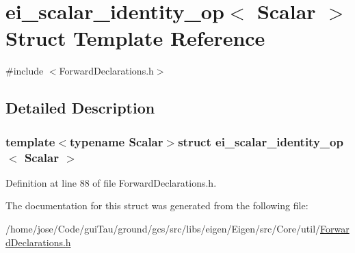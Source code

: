 \hypertarget{structei__scalar__identity__op}{\section{ei\-\_\-scalar\-\_\-identity\-\_\-op$<$ Scalar $>$ Struct Template Reference}
\label{structei__scalar__identity__op}
}


{\ttfamily \#include $<$Forward\-Declarations.\-h$>$}



\subsection{Detailed Description}
\subsubsection*{template$<$typename Scalar$>$struct ei\-\_\-scalar\-\_\-identity\-\_\-op$<$ Scalar $>$}



Definition at line 88 of file Forward\-Declarations.\-h.



The documentation for this struct was generated from the following file\-:\begin{DoxyCompactItemize}
\item 
/home/jose/\-Code/gui\-Tau/ground/gcs/src/libs/eigen/\-Eigen/src/\-Core/util/\hyperlink{_forward_declarations_8h}{Forward\-Declarations.\-h}\end{DoxyCompactItemize}

